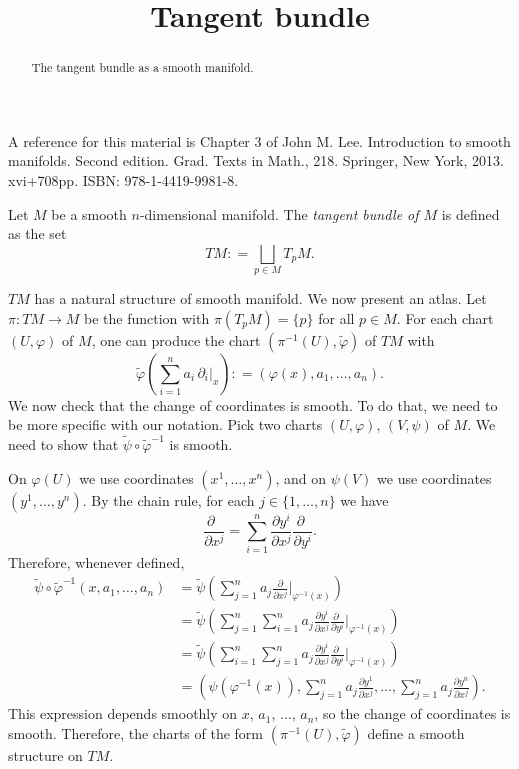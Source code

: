 \documentclass{ximera}
\title{Tangent bundle}
\begin{document}
    \begin{abstract} The tangent bundle as a smooth manifold.    \end{abstract}
    \maketitle

        A reference for this material is Chapter 3 of John M. Lee. Introduction to smooth manifolds. Second edition. Grad. Texts in Math., 218. Springer, New York, 2013. xvi+708pp. ISBN: 978-1-4419-9981-8.


        \begin{definition}
            Let $M$ be a smooth $n$-dimensional manifold. The \emph{tangent bundle of $M$} is defined as the set
            \[   TM : = \bigsqcup_{p \in M} T_pM    .   \]
        \end{definition}

        $TM$ has a natural structure of smooth manifold. We now present an atlas.  Let $\pi : TM \to M $ be the function with $\pi (T_pM) = \{ p \}$ for all $p \in M$.  For each chart $(U, \varphi) $ of $M$, one can produce the chart $(\pi ^{-1} (U) , \tilde{\varphi})$ of $TM$ with 
        \[     \tilde{\varphi} \left(  \sum_{i = 1 }^n  a_i \, \partial_i \vert _x  \right) : = (  \varphi (x) , a_1, \ldots , a_n ) .       \]
        We now check that the change of coordinates is smooth. To do that, we need to be more specific with our notation. Pick two charts $(U,\varphi)$, $(V, \psi)$  of $M$. We need to show that $\tilde{\psi} \circ \tilde{\varphi} ^{-1}$ is smooth. 

        On $\varphi (U) $ we use coordinates $(x^1, \ldots , x^n)$, and on $\psi (V) $ we use coordinates $(y^1 , \ldots , y^n)$. By the chain rule, for each $j \in \{ 1,\ldots , n \} $ we have 
        \[         \frac{\partial \,\,\, }{\partial x^j} = \sum_{ i = 1 } ^n  \frac{\partial y^i}{\partial x ^j} \frac{\partial \,\, }{\partial y^i} .            \]
        Therefore, whenever defined, 
        \begin{align*}
            \tilde{\psi} \circ \tilde{\varphi} ^{-1} (x , a_1, \ldots , a_n)  & = \tilde{\psi } \left( \sum _{ j = 1 } ^n a_j  \frac{\partial }{\partial x^j  } \Big\vert _{ \varphi ^{-1} (x) }   \right) \\
            & =  \tilde{\psi } \left( \sum _{ j = 1 } ^n  \sum _{i = 1 } ^n a_j  \frac{\partial y^i}{\partial x ^j} \frac{\partial \,\, }{\partial y^i}  \Big\vert _{ \varphi ^{-1} (x) }   \right) \\
            & =  \tilde{\psi } \left( \sum _{ i = 1 } ^n  \sum _{j  = 1 } ^n a_j  \frac{\partial y^i}{\partial x ^j} \frac{\partial \,\, }{\partial y^i}  \Big\vert _{ \varphi ^{-1} (x) }   \right ) \\
            & =   \left( \psi ( \varphi ^{-1} (x)) ,  \sum _{j  = 1 } ^n a_j  \frac{\partial y^1}{\partial x ^j}  ,  \ldots ,   \sum _{j  = 1 } ^n a_j  \frac{\partial y^n}{\partial x ^j}  \right)  .
        \end{align*}
    This expression depends smoothly on $x$, $a_1$, $\ldots$, $a_n$, so the change of coordinates is smooth. Therefore, the charts of the form $(\pi ^{-1} (U) , \tilde{\varphi})$ define a smooth structure on $TM$. 
\end{document}
